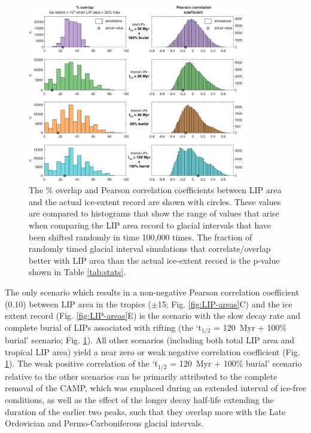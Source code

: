 \begin{figure}[h!]
\begin{center}
	\includegraphics[width=0.85\textwidth]{figures/LIPs/overlap-correlation.pdf}
	\caption[Correlation between large igneous province area and the actual and simulated ice-extent records.]{The \% overlap and Pearson correlation coefficients between LIP area and the actual ice-extent record are shown with circles. These values are compared to histograms that show the range of values that arise when comparing the LIP area record to glacial intervals that have been shifted randomly in time 100,000 times. The fraction of randomly timed glacial interval simulations that correlate/overlap better with LIP area than the actual ice-extent record is the p-value shown in Table \ref{tab:stats}.}
	\label{fig:LIP-correlation}
\end{center}
\end{figure}

The only scenario which results in a non-negative Pearson correlation coefficient (0.10) between LIP area in the tropics ($\pm$15\degrees; Fig. \ref{fig:LIP-areas}C) and the ice extent record (Fig. \ref{fig:LIP-areas}E) is the scenario with the slow decay rate and complete burial of LIPs associated with rifting (the `t$_{1/2}$ = 120~Myr + 100\% burial' scenario; Fig. \ref{fig:LIP-correlation}). All other scenarios (including both total LIP area and tropical LIP area) yield a near zero or weak negative correlation coefficient (Fig. \ref{fig:LIP-correlation}). The weak positive correlation of the `t$_{1/2}$ = 120~Myr + 100\% burial' scenario relative to the other scenarios can be primarily attributed to the complete removal of the CAMP, which was emplaced during an extended interval of ice-free conditions, as well as the effect of the longer decay half-life extending the duration of the earlier two peaks, such that they overlap more with the Late Ordovician and Permo-Carboniferous glacial intervals.

